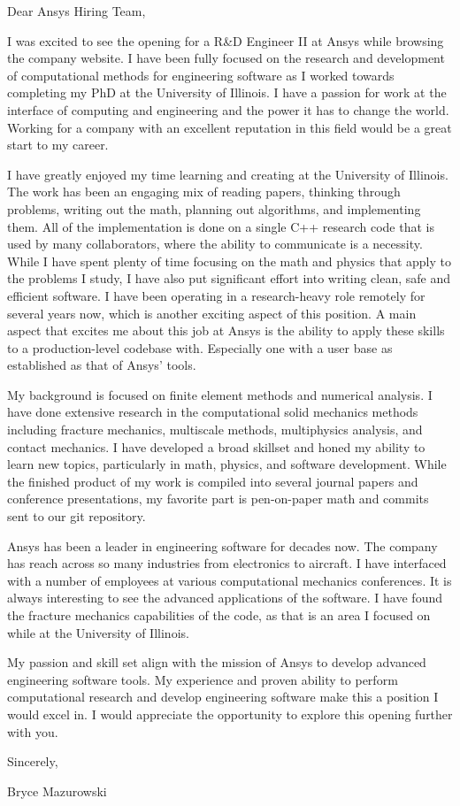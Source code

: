 \documentclass{resume}
\begin{document}
\vspace{0.5in}
Dear Ansys Hiring Team,

I was excited to see the opening for a R\&D Engineer II at
Ansys while browsing the company website.
%
I have been fully focused on the research and development of
computational methods for engineering software as I worked towards
completing my PhD at the University of Illinois.
%
I have a passion for work at the interface
of computing and engineering and the power it has to change the world.
%
Working for a company with an excellent reputation in this field would
be a great start to my career.
%

I have greatly enjoyed my time learning and creating at the University
of Illinois.
%
The work has been an engaging mix of reading papers, thinking through
problems, writing out the math, planning out algorithms, and
implementing them.
%
All of the implementation is done on a single C++ research code that
is used by many collaborators, where the ability to communicate
is a necessity. 
%
While I have spent plenty of time focusing on the math and physics
that apply to the problems I study, I have also put significant effort
into writing clean, safe and efficient software.
%
I have been operating in a research-heavy role remotely for
several years now, which is another exciting aspect of this position.
%
A main aspect that excites me about this job at Ansys is the ability to
apply these skills to a production-level codebase with.
%
Especially one with a user base as established as that of Ansys' tools.
%

My background is focused on finite element methods and numerical analysis.
%
I have done extensive research in the computational solid mechanics
methods including fracture mechanics, multiscale methods, multiphysics
analysis, and contact mechanics.
%
I have developed a broad skillset and honed my ability to learn new
topics, particularly in math, physics, and software development.
%
While the finished product of my work is compiled into several journal
papers and conference presentations, my favorite part is pen-on-paper math
and commits sent to our git repository.
%

Ansys has been a leader in engineering software for decades now.
%
The company has reach across so many industries from electronics to
aircraft.
%
I have interfaced with a number of employees at various computational
mechanics conferences.
%
It is always interesting to see the advanced applications of the
software. 
%
I have found the fracture mechanics capabilities of the code, as that
is an area I focused on while at the University of Illinois.
%

My passion and skill set align with the mission of Ansys to develop
advanced engineering software tools.
%
My experience and proven ability to perform computational research
and develop engineering software make this a position I would excel in.
%
I would appreciate the opportunity to explore this opening further with you.
%


Sincerely,

Bryce Mazurowski
\end{document}

